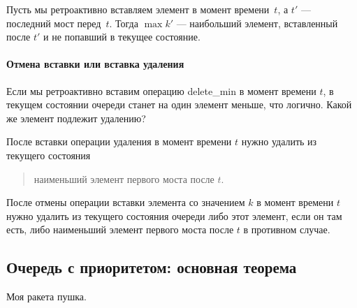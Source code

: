 \begin{stat}
	Пусть мы ретроактивно вставляем элемент в момент времени~$t$, а $t'$ — последний мост перед~$t$. Тогда $\max k'$ — наибольший элемент, вставленный после $t'$ и не попавший в текущее состояние.
\end{stat} \vspace{-4mm}

\paragraph{Отмена вставки или вставка удаления} Если мы ретроактивно вставим операцию delete\_min в момент времени $t$, в текущем состоянии очереди станет на один элемент меньше, что логично. Какой же элемент подлежит удалению?

\begin{stat}
	После вставки операции удаления в момент времени $t$ нужно удалить из текущего состояния
\begin{quote}
	наименьший элемент первого моста после $t$.
\end{quote}
	После отмены операции вставки элемента со значением $k$ в момент времени $t$ нужно удалить из текущего состояния очереди либо этот элемент, если он там есть, либо наименьший элемент первого моста после $t$ в противном случае.
\end{stat}

\subsection{Очередь с приоритетом: основная теорема}

\begin{theorem} 
	Моя ракета пушка.
\end{theorem}